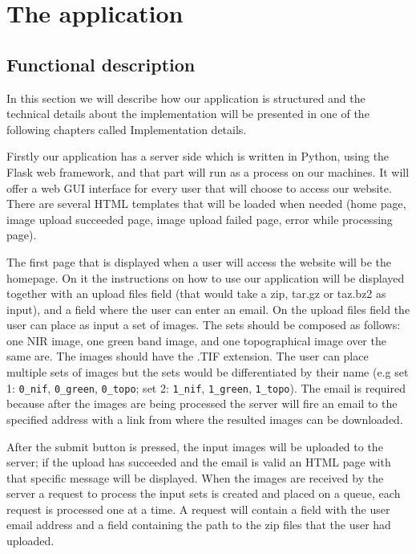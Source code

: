 \documentclass[12pt, a4paper]{report}
\begin{document}
\newpage
\chapter{The application}

\section{Functional description}

\quad 
In this section we will describe how our application is structured and the technical details about the implementation will be presented in one of the following chapters called Implementation details. 
\par 

Firstly our application has a server side which is written in Python, using the Flask web framework, and that part will run as a process on our machines. It will offer a web GUI interface for every user that will choose to access our website. There are several HTML templates that will be loaded when needed (home page, image upload succeeded page, image upload failed page, error while processing page). 
\par 

The first page that is displayed when a user will access the website will be the homepage. On it the instructions on how to use our application will be displayed together with an upload files field (that would take a zip, tar.gz or taz.bz2 as input), and a field where the user can enter an email. On the upload files field the user can place as input a set of images. The sets should be composed as follows: one NIR image, one green band image, and one topographical image over the same are. The images should have the .TIF extension. The user can place multiple sets of images but the sets would be differentiated by their name (e.g set 1: \texttt{0\_nif}, \texttt{0\_green}, \texttt{0\_topo}; set 2: \texttt{1\_nif}, \texttt{1\_green}, \texttt{1\_topo}). The email is required because after the images are being processed the server will fire an email to the specified address with a link from where the resulted images can be downloaded.
\par 

After the submit button is pressed, the input images will be uploaded to the server; if the upload has succeeded and the email is valid an HTML page with that specific message will be displayed. When the images are received by the server a request to process the input sets is created and placed on a queue, each request is processed one at a time. A request will contain a field with the user email address and a field containing the path to the zip files that the user had uploaded.
\par 
\end{document}
